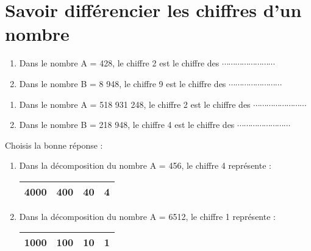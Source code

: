 







\section{Savoir différencier les chiffres d'un nombre}


\begin{enumerate}
\item Dans le nombre A = 428, le chiffre 2 est le chiffre des $\cdots\cdots\cdots\cdots\cdots\cdots\cdots\cdots$
\item Dans le nombre B = 8 948, le chiffre 9 est le chiffre des $\cdots\cdots\cdots\cdots\cdots\cdots\cdots\cdots$
\end{enumerate}



\begin{enumerate}
\item Dans le nombre A = 518 931 248, le chiffre 2 est le chiffre des $\cdots\cdots\cdots\cdots\cdots\cdots\cdots\cdots$
\item Dans le nombre B = 218 948, le chiffre 4 est le chiffre des $\cdots\cdots\cdots\cdots\cdots\cdots\cdots\cdots$
\end{enumerate}




Choisis la bonne réponse :
\begin{enumerate}
\item Dans la décomposition du nombre A = 456, le chiffre 4 représente :
\begin{tabular}{|c|c|c|c|}
\hline 
4000 & 400 & 40 & 4 \\ 
\hline 
\end{tabular}  

\item Dans la décomposition du nombre A = 6512, le chiffre 1 représente :
\begin{tabular}{|c|c|c|c|}
\hline 
1000 & 100 & 10 & 1 \\ 
\hline 
\end{tabular} 
\end{enumerate}



